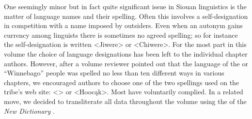 \begin{refsection}
One seemingly minor but in fact quite significant issue in Siouan linguistics is the matter of language names and their spelling. Often this involves a self-designation in competition with a name imposed by outsiders. Even when an autonym gains currency among linguists there is sometimes no agreed spelling; so for instance the  self-designation is written <Jiwere> or <Chiwere>. For the most part in this volume the choice of language designations has been left to the individual chapter authors. However, after a volume reviewer pointed out that the language of the  or ``Winnebago'' people was spelled no less than ten different ways in various chapters, we encouraged authors to choose one of the two spellings used on the tribe's web site:  <> or <Hooc\k{a}k>.  Most have voluntarily complied.  In a related move, we decided to transliterate all  data throughout the volume using the  of the \textit{New  Dictionary} \citep{Ullrich2012}.
 

\end{refsection}
